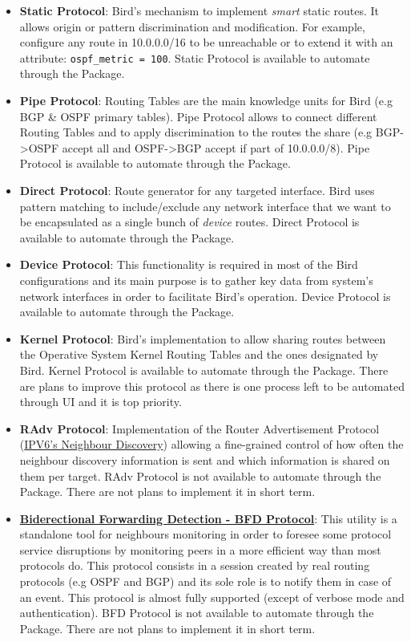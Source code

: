 \begin{itemize}
    \item \textbf{Static Protocol}: Bird's mechanism to implement \textit{smart} static routes. It allows  origin or pattern discrimination and modification. For example, configure any route in 10.0.0.0/16 to be unreachable or to extend it with an attribute: \texttt{ospf\_metric = 100}.
    Static Protocol is available to automate through the Package.
    \item \textbf{Pipe Protocol}: Routing Tables are the main knowledge units for Bird (e.g BGP \& OSPF primary tables). Pipe Protocol allows to connect different Routing Tables and to apply discrimination to the routes the share (e.g BGP->OSPF accept all and OSPF->BGP accept if part of 10.0.0.0/8).
    Pipe Protocol is available to automate through the Package.
    \item \textbf{Direct Protocol}: Route generator for any targeted interface. Bird uses pattern matching to include/exclude any network interface that we want to be encapsulated as a single bunch of \textit{device} routes.
    Direct Protocol is available to automate through the Package.
    \item \textbf{Device Protocol}: This functionality is required in most of the Bird configurations and its main purpose is to gather key data from system's network interfaces in order to facilitate Bird's operation.
    Device Protocol is available to automate through the Package.
    \item \textbf{Kernel Protocol}: Bird's implementation to allow sharing routes between the Operative System Kernel Routing Tables and the ones designated by Bird.
    Kernel Protocol is available to automate through the Package. There are plans to improve this protocol as there is one process left to be automated through UI and it is top priority.
    \item \textbf{RAdv Protocol}: Implementation of the Router Advertisement Protocol (\href{https://tools.ietf.org/html/rfc4861}{IPV6's Neighbour Discovery}) allowing a fine-grained control of how often the neighbour discovery information is sent and which information is shared on them per target.
    RAdv Protocol is not available to automate through the Package. There are not plans to implement it in short term.
    \item \textbf{\href{https://www.rfc-editor.org/rfc/rfc5880.txt}{Biderectional Forwarding Detection - BFD Protocol}}: This utility is a standalone tool for neighbours monitoring in order to foresee some protocol service disruptions by monitoring peers in a more efficient way than most protocols do. This protocol consists in a session created by real routing protocols (e.g OSPF and BGP) and its sole role is to notify them in case of an event. This protocol is almost fully supported (except of verbose mode and authentication).
    BFD Protocol is not available to automate through the Package. There are not plans to implement it in short term.
\end{itemize}

